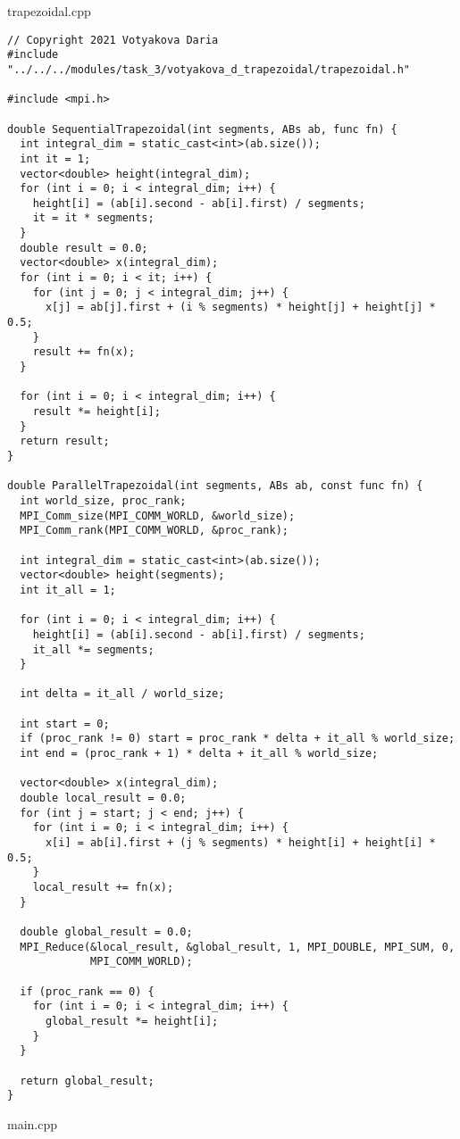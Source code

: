 \documentclass{report}
\begin{document}
trapezoidal.cpp
\begin{lstlisting}
// Copyright 2021 Votyakova Daria
#include "../../../modules/task_3/votyakova_d_trapezoidal/trapezoidal.h"

#include <mpi.h>

double SequentialTrapezoidal(int segments, ABs ab, func fn) {
  int integral_dim = static_cast<int>(ab.size());
  int it = 1;
  vector<double> height(integral_dim);
  for (int i = 0; i < integral_dim; i++) {
    height[i] = (ab[i].second - ab[i].first) / segments;
    it = it * segments;
  }
  double result = 0.0;
  vector<double> x(integral_dim);
  for (int i = 0; i < it; i++) {
    for (int j = 0; j < integral_dim; j++) {
      x[j] = ab[j].first + (i % segments) * height[j] + height[j] * 0.5;
    }
    result += fn(x);
  }

  for (int i = 0; i < integral_dim; i++) {
    result *= height[i];
  }
  return result;
}

double ParallelTrapezoidal(int segments, ABs ab, const func fn) {
  int world_size, proc_rank;
  MPI_Comm_size(MPI_COMM_WORLD, &world_size);
  MPI_Comm_rank(MPI_COMM_WORLD, &proc_rank);

  int integral_dim = static_cast<int>(ab.size());
  vector<double> height(segments);
  int it_all = 1;

  for (int i = 0; i < integral_dim; i++) {
    height[i] = (ab[i].second - ab[i].first) / segments;
    it_all *= segments;
  }

  int delta = it_all / world_size;

  int start = 0;
  if (proc_rank != 0) start = proc_rank * delta + it_all % world_size;
  int end = (proc_rank + 1) * delta + it_all % world_size;

  vector<double> x(integral_dim);
  double local_result = 0.0;
  for (int j = start; j < end; j++) {
    for (int i = 0; i < integral_dim; i++) {
      x[i] = ab[i].first + (j % segments) * height[i] + height[i] * 0.5;
    }
    local_result += fn(x);
  }

  double global_result = 0.0;
  MPI_Reduce(&local_result, &global_result, 1, MPI_DOUBLE, MPI_SUM, 0,
             MPI_COMM_WORLD);

  if (proc_rank == 0) {
    for (int i = 0; i < integral_dim; i++) {
      global_result *= height[i];
    }
  }

  return global_result;
}
\end{lstlisting}
main.cpp
\end{document}
